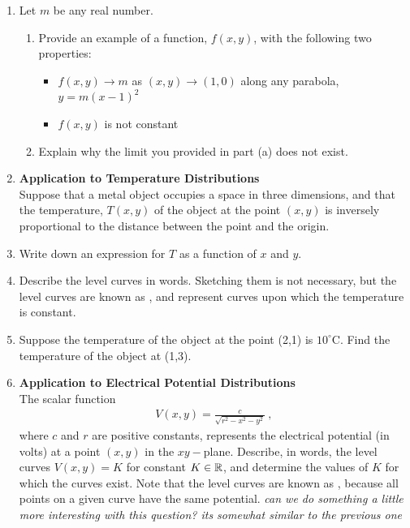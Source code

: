 \documentclass{article}
\begin{document}
\begin{enumerate}
\item Let $m$ be any real number. 
\begin{enumerate}
\item Provide an example of a function, $f(x,y)$, with the following two properties:
\begin{itemize}
\item $f(x,y) \rightarrow m$ as $(x,y) \rightarrow (1,0)$ along any parabola, $y=m(x-1)^2$
\item $f(x,y)$ is not constant
\end{itemize}
\item Explain why the limit you provided in part (a) does not exist. 
\end{enumerate}
\item \textbf{Application to Temperature Distributions}\\
Suppose that a metal object occupies a space in three dimensions, and that the temperature, $T(x,y)$ of the object at the point $(x,y)$ is inversely proportional to the distance between the point and the origin. 
\BEN
\item Write down an expression for $T$ as a function of $x$ and $y$.
\item Describe the level curves in words. Sketching them is not necessary, but the level curves are known as , and represent curves upon which the temperature is constant. 
\item Suppose the temperature of the object at the point (2,1) is $10^{\circ}$C. Find the temperature of the object at (1,3).
\EEN
\item \textbf{Application to Electrical Potential Distributions}\\
The scalar function
\begin{align*}
V(x,y) = \frac{c}{\sqrt{r^2 - x^2 -y^2}}\ ,
\end{align*}
where $c$ and $r$ are positive constants, represents the electrical potential (in volts) at a point $(x,y)$ in the $xy-$plane. Describe, in words, the level curves $V(x,y)=K$ for constant $K\in\mathbb{R}$, and determine the values of $K$ for which the curves exist. Note that the level curves are known as , because all points on a given curve have the same potential. \textit{can we do something a little more interesting with this question? its somewhat similar to the previous one}


\end{enumerate}
\end{document}
